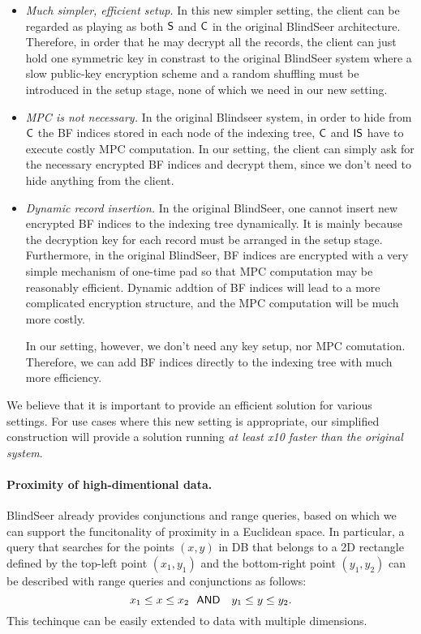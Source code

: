 \begin{itemize}
\item {\em Much simpler, efficient setup.}
In this new simpler setting, the client can be regarded as playing as both $\sf
 S$ and $\sf C$ in the original BlindSeer architecture. Therefore, in order
 that he may decrypt all the records, the client can just hold one symmetric
 key in constrast to the original BlindSeer system where a slow public-key
 encryption scheme and a random shuffling must be introduced in the setup
 stage, none of which we need in our new setting. 

\item {\em MPC is not necessary.} In the original Blindseer system, in order to
hide from $\sf C$ the BF indices stored in each node of the indexing tree, $\sf
C$ and $\sf IS$ have to execute costly MPC computation. In our setting, the
client can simply ask for the necessary encrypted BF indices and decrypt
them, since we don't need to hide anything from the client.  


\item {\em Dynamic record insertion.} In the original BlindSeer, one cannot
insert new encrypted BF indices to the indexing tree dynamically.  It is mainly
because the decryption key for each record must be arranged in the setup
stage.
%
Furthermore, in the original BlindSeer, BF indices are encrypted with a very
    simple mechanism of one-time pad so that MPC computation may be reasonably
    efficient. Dynamic addtion of BF indices will lead to a more complicated
    encryption structure, and the MPC computation will be much more costly.

In our setting, however, we don't need any key setup, nor MPC comutation.
Therefore, we can add BF indices directly to the indexing tree with much more
efficiency.  
\end{itemize}

We believe that it is important to provide an efficient solution for various
settings. For use cases where this new setting is appropriate, our simplified
construction will provide a solution running {\em at least x10 faster than the
original system}.  

\paragraph{Proximity of high-dimentional data.}
BlindSeer already provides conjunctions and range queries, based on which we
can support the funcitonality of proximity in a Euclidean space. 
In particular, a query that searches for the points $(x, y)$ in DB that belongs
to a 2D rectangle defined by the top-left point $(x_1, y_1)$ and the
bottom-right point $(y_1, y_2)$ can be described with range queries and
conjunctions as follows: $$ x_1 \le x \le x_2 ~~{\sf AND}~~~ y_1 \le y \le y_2.
$$ This techinque can be easily extended to data with multiple dimensions. 

